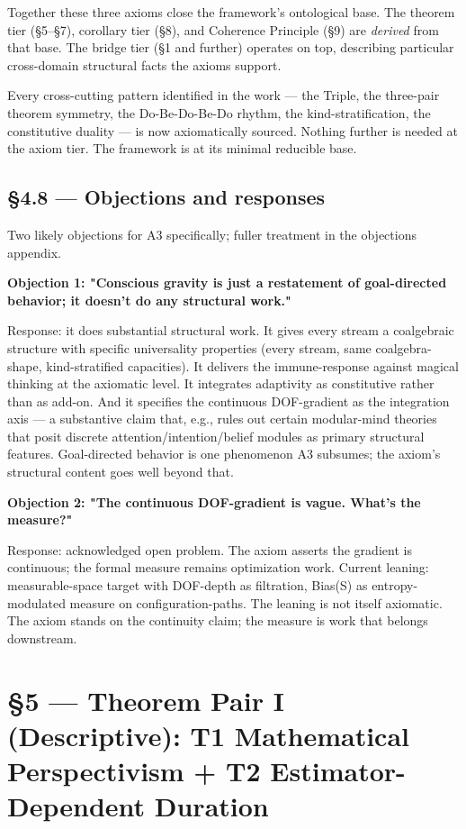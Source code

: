 \documentclass[11pt, openany]{book}
\newcommand{\sectionbreak}{\clearpage}
\begin{document}
Together these three axioms close the framework's ontological base. The theorem tier (§5–§7), corollary tier (§8), and Coherence Principle (§9) are \textit{derived} from that base. The bridge tier (§1 and further) operates on top, describing particular cross-domain structural facts the axioms support.

Every cross-cutting pattern identified in the work --- the Triple, the three-pair theorem symmetry, the Do-Be-Do-Be-Do rhythm, the kind-stratification, the constitutive duality --- is now axiomatically sourced. Nothing further is needed at the axiom tier. The framework is at its minimal reducible base.

\sectionbreak

\section{§4.8 --- Objections and responses}

Two likely objections for A3 specifically; fuller treatment in the objections appendix.

\textbf{Objection 1: "Conscious gravity is just a restatement of goal-directed behavior; it doesn't do any structural work."}

Response: it does substantial structural work. It gives every stream a coalgebraic structure with specific universality properties (every stream, same coalgebra-shape, kind-stratified capacities). It delivers the immune-response against magical thinking at the axiomatic level. It integrates adaptivity as constitutive rather than as add-on. And it specifies the continuous DOF-gradient as the integration axis --- a substantive claim that, e.g., rules out certain modular-mind theories that posit discrete attention/intention/belief modules as primary structural features. Goal-directed behavior is one phenomenon A3 subsumes; the axiom's structural content goes well beyond that.

\textbf{Objection 2: "The continuous DOF-gradient is vague. What's the measure?"}

Response: acknowledged open problem. The axiom asserts the gradient is continuous; the formal measure remains optimization work. Current leaning: measurable-space target with DOF-depth as filtration, Bias(S) as entropy-modulated measure on configuration-paths. The leaning is not itself axiomatic. The axiom stands on the continuity claim; the measure is work that belongs downstream.

\chapter{§5 — Theorem Pair I (Descriptive): T1 Mathematical Perspectivism + T2 Estimator-Dependent Duration}
\end{document}

